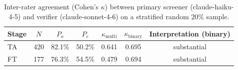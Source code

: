 \begin{table}[htbp]
\centering
\caption{Inter-rater agreement (Cohen's $\kappa$) between primary screener (claude-haiku-4-5) and verifier (claude-sonnet-4-6) on a stratified random 20\% sample.}
\label{tab:kappa-results}
\begin{tabular}{lcccccc}
\toprule
Stage & $N$ & $P_o$ & $P_e$ & $\kappa_{\text{multi}}$ & $\kappa_{\text{binary}}$ & Interpretation (binary) \\
\midrule
TA & 420 & 82.1\% & 50.2\% & 0.641 & 0.695 & substantial \\
FT & 177 & 76.3\% & 54.5\% & 0.479 & 0.694 & substantial \\
\bottomrule
\end{tabular}
\end{table}